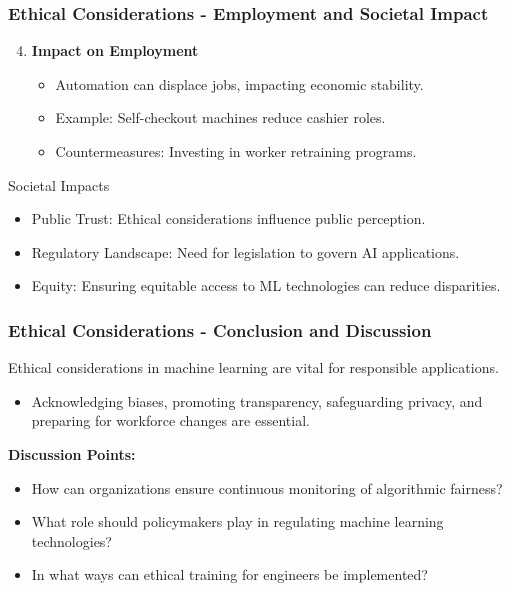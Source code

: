 \documentclass{beamer}
\begin{document}
\begin{frame}[fragile]
    \frametitle{Ethical Considerations - Employment and Societal Impact}
    \begin{enumerate}
        \setcounter{enumi}{3}
        \item \textbf{Impact on Employment}
        \begin{itemize}
            \item Automation can displace jobs, impacting economic stability.
            \item Example: Self-checkout machines reduce cashier roles.
            \item Countermeasures: Investing in worker retraining programs.
        \end{itemize}
    \end{enumerate}
    
    \begin{block}{Societal Impacts}
        \begin{itemize}
            \item Public Trust: Ethical considerations influence public perception.
            \item Regulatory Landscape: Need for legislation to govern AI applications.
            \item Equity: Ensuring equitable access to ML technologies can reduce disparities.
        \end{itemize}
    \end{block}
\end{frame}

\begin{frame}[fragile]
    \frametitle{Ethical Considerations - Conclusion and Discussion}
    Ethical considerations in machine learning are vital for responsible applications. 
    \begin{itemize}
        \item Acknowledging biases, promoting transparency, safeguarding privacy, and preparing for workforce changes are essential.
    \end{itemize}
    
    \textbf{Discussion Points:}
    \begin{itemize}
        \item How can organizations ensure continuous monitoring of algorithmic fairness?
        \item What role should policymakers play in regulating machine learning technologies?
        \item In what ways can ethical training for engineers be implemented?
    \end{itemize}
\end{frame}
\end{document}
